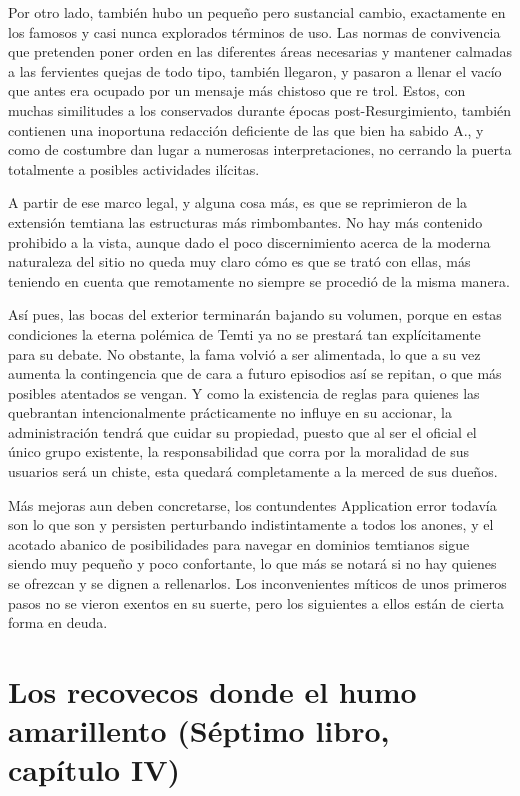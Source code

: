 \documentclass[
]{book}
\begin{document}
Por otro lado, también hubo un pequeño pero sustancial cambio, exactamente en los famosos y casi nunca explorados términos de uso. Las normas de convivencia que pretenden poner orden en las diferentes áreas necesarias y mantener calmadas a las fervientes quejas de todo tipo, también llegaron, y pasaron a llenar el vacío que antes era ocupado por un mensaje más chistoso que re trol. Estos, con muchas similitudes a los conservados durante épocas post-Resurgimiento, también contienen una inoportuna redacción deficiente de las que bien ha sabido A., y como de costumbre dan lugar a numerosas interpretaciones, no cerrando la puerta totalmente a posibles actividades ilícitas.

A partir de ese marco legal, y alguna cosa más, es que se reprimieron de la extensión temtiana las estructuras más rimbombantes. No hay más contenido prohibido a la vista, aunque dado el poco discernimiento acerca de la moderna naturaleza del sitio no queda muy claro cómo es que se trató con ellas, más teniendo en cuenta que remotamente no siempre se procedió de la misma manera.

Así pues, las bocas del exterior terminarán bajando su volumen, porque en estas condiciones la eterna polémica de Temti ya no se prestará tan explícitamente para su debate. No obstante, la fama volvió a ser alimentada, lo que a su vez aumenta la contingencia que de cara a futuro episodios así se repitan, o que más posibles atentados se vengan. Y como la existencia de reglas para quienes las quebrantan intencionalmente prácticamente no influye en su accionar, la administración tendrá que cuidar su propiedad, puesto que al ser el oficial el único grupo existente, la responsabilidad que corra por la moralidad de sus usuarios será un chiste, esta quedará completamente a la merced de sus dueños.

Más mejoras aun deben concretarse, los contundentes Application error todavía son lo que son y persisten perturbando indistintamente a todos los anones, y el acotado abanico de posibilidades para navegar en dominios temtianos sigue siendo muy pequeño y poco confortante, lo que más se notará si no hay quienes se ofrezcan y se dignen a rellenarlos. Los inconvenientes míticos de unos primeros pasos no se vieron exentos en su suerte, pero los siguientes a ellos están de cierta forma en deuda.

\hypertarget{los-recovecos-donde-el-humo-amarillento-suxe9ptimo-libro-capuxedtulo-iv}{%
\section{Los recovecos donde el humo amarillento (Séptimo libro, capítulo IV)}\label{los-recovecos-donde-el-humo-amarillento-suxe9ptimo-libro-capuxedtulo-iv}}
\end{document}
